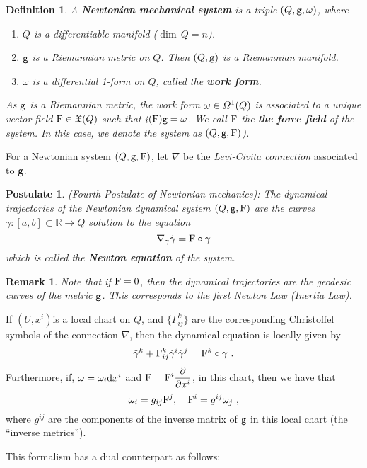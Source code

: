 \documentclass[12pt]{report}
\newtheorem{definition}[teor]{Definition}
\newtheorem{remark}[teor]{Remark}
\newtheorem{pos}[teor]{Postulate}
\def\beq{\begin{equation}}
\def\eeq{\end{equation}}
\def\ben{\begin{enumerate}}
\def\een{\end{enumerate}}
\def\dst{\displaystyle}
\def\derpar#1#2{\frac{\partial{#1}}{\partial{#2}}}
\def\df{{\mit\Omega}}
\def\d{{\rm d}}
\def\Real{\mathbb{R}}
\def\inn{\mathop{i}\nolimits}
\begin{document}
\begin{definition}
A \textbf{Newtonian mechanical system} is a triple $(Q,{\tt g},\omega)$, where
\ben
\item
$Q$ is a differentiable manifold ($\dim\, Q=n$).
\item
${\tt g}$ is a {\sl Riemannian metric} on $Q$. Then  $(Q,{\tt g})$ is a Riemannian manifold.
\item
$\omega$ is a differential 1-form on $Q$, called the \textbf{work form}.
\een
As ${\tt g}$ is a Riemannian metric, the work form $\omega\in\df^1(Q)$
is associated to a unique vector field ${\rm F}\in\mathfrak{X} (Q)$ such that
$\inn({\rm F}) {\tt g}=\omega$. We call  ${\rm F}$ the
\textbf{the force field} of the system. 
In this case, we denote the system as $(Q,{\tt g},{\rm F})$).
\end{definition}

For a Newtonian system $(Q,{\tt g},{\rm F})$, let $\nabla$ be the {\sl Levi-Civita connection} associated to ${\tt g}$.

\begin{pos}
{\rm (Fourth Postulate of Newtonian mechanics\/)}:
The dynamical trajectories of the Newtonian dynamical system
$(Q,{\tt g},{\rm F})$ are the curves $\gamma\colon[a,b]\subset\Real\to Q$
solution to the equation
\beq
\nabla_{\dot{\gamma}}\dot\gamma ={\rm F}\circ\gamma
\label{eqdin}
\eeq
which is called the \textbf{Newton equation} of the system.
\end{pos}

\begin{remark}{\rm 
Note that if ${\rm F}=0$, then the dynamical trajectories are the geodesic curves of the metric ${\tt g}$. 
This corresponds to the first Newton Law ({\sl Inertia Law\/}).
}\end{remark}

If $(U,x^i)$is a local chart on $Q$, and $\{\Gamma^k_{ij}\}$
are the corresponding Christoffel symbols of the connection $\nabla$, then the dynamical equation is locally given by
$$
\ddot\gamma^k+\Gamma_{ij}^k\dot\gamma^i\dot\gamma^j={\rm F}^k\circ\gamma \ .
$$
Furthermore, if, $\omega=\omega_i\d x^i$ and 
\(\dst {\rm F}={\rm F}^i\derpar{}{x^i}\), 
in this chart, then we have that
$$
\omega_i=g_{ij}{\rm F}^j ,\quad
{\rm F}^i=g^{ij}\omega_j \ ,
$$
where $g^{ij}$ are the components of the inverse matrix of ${\tt g}$ in this local chart (the ``inverse metrics'').

This formalism has a dual counterpart as follows:
\end{document}
